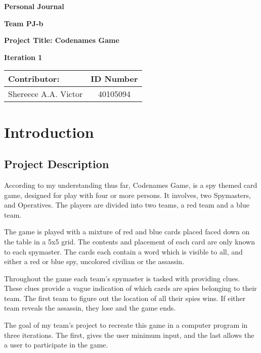 \documentclass[12pt]{article}
\begin{document}
\vspace*{0.5in}
\centerline{\bf\Large Personal Journal}
\vspace*{0.5in}
\centerline{\bf\Large Team PJ-b}
\vspace*{0.5in}
\centerline{\bf\Large Project Title: Codenames Game }
\vspace*{0.25in}
\centerline{\bf\Large Iteration 1}


\vspace*{2in}
\begin{table}[htbp]
\begin{center}
\begin{tabular}{|l | c|}
\hline
Contributor: & ID Number \\
\hline
Shereece A.A. Victor  & 40105094  \\
\hline
\end{tabular}
\end{center}
\end{table}

\clearpage
\section{Introduction}

\subsection{Project Description}
According to my understanding thus far, Codenames Game, is a spy themed card game, designed for play with four or more persons. It involves, two Spymasters, and Operatives. The players are divided into two teams, a red team and a blue team. 

The game is played with a mixture of red and blue cards placed faced down on the table in a 5x5 grid. The contents and placement of each card are only known to each spymaster. The cards each contain a word which is visible to all, and either a red or blue spy, uncolored civilian or the assassin. 

Throughout the game each team’s spymaster is tasked with providing clues. These clues provide a vague indication of which cards are spies belonging to their team. The first team to figure out the location of all their spies wins. If either team reveals the assassin, they lose and the game ends. 

The goal of my team’s project to recreate this game in a computer program in three iterations. The first, gives the user minimum input, and the last allows the a user to participate in the game. 
\end{document}
